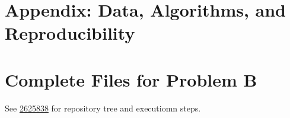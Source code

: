 \documentclass[a4paper,12pt]{article}
\begin{document}
\appendix
\section{Appendix: Data, Algorithms, and Reproducibility}\label{app:all}


\section{Complete Files for Problem B}
See \href{https://github.com/charles65536/model2026-2}{2625838} for repository tree and executiomn steps.
\clearpage


\begingroup
{}
\fontsize{9}{10.5}
\selectfont
\section*{}

\endgroup
\end{document}
